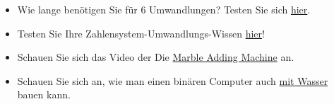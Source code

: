 \begin{mychallenge}\label{challenge:online}
	\begin{itemize}
		\item Wie lange benötigen Sie für 6 Umwandlungen? Testen Sie sich \href{https://oinf.ch/interactive/umrechnen-zwischen-zahlensystemen/}{hier}.
		\item Testen Sie Ihre Zahlensystem-Umwandlungs-Wissen \href{https://oinf.ch/interactive/basiswechsel-10-zu-2/}{hier}!
		\item Schauen Sie sich das Video der Die \href{https://www.youtube.com/watch?app=desktop&v=GcDshWmhF4A&embeds_referring_euri=https%3A%2F%2Fwww.yaplakal.com%2Fforum28%2Fst%2F125%2Ftopic930979.html&feature=emb_imp_woyt}{Marble Adding Machine} an.
		\item Schauen Sie sich an, wie man einen binären Computer auch \href{https://youtu.be/5wKz1e0ULcg?si=AiPXUniyfU15X11m}{mit Wasser} bauen kann.
	\end{itemize}
\end{mychallenge}
